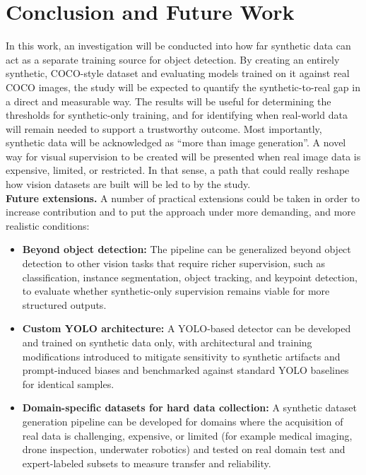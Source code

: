 \documentclass[conference]{IEEEtran}
\begin{document}
\section{Conclusion and Future Work} 
In this work, an investigation will be conducted into how far synthetic data can act as a separate training source for object detection. By creating an entirely synthetic, COCO-style dataset and evaluating models trained on it against real COCO images, the study will be expected to quantify the synthetic-to-real gap in a direct and measurable way. The results will be useful for determining the thresholds for synthetic-only training, and for identifying when real-world data will remain needed to support a trustworthy outcome. Most importantly, synthetic data will be acknowledged as “more than image generation”. A novel way for visual supervision to be created will be presented when real image data is expensive, limited, or restricted. In that sense, a path that could really reshape how vision datasets are built will be led to by the study.
\\
\noindent \textbf{Future extensions.} A number of practical extensions could be taken in order to increase contribution and to put the approach under more demanding, and more realistic conditions:
\begin{itemize}[leftmargin=*,itemsep=2pt,topsep=2pt]
    \item \textbf{ Beyond object detection:} The pipeline can be generalized beyond object detection to other vision tasks that require richer supervision, such as classification, instance segmentation, object tracking, and keypoint detection, to evaluate whether synthetic-only supervision remains viable for more structured outputs.

    \item \textbf{Custom YOLO architecture:} A YOLO-based detector can be developed and trained on synthetic data only, with architectural and training modifications introduced to mitigate sensitivity to synthetic artifacts and prompt-induced biases and benchmarked against standard YOLO baselines for identical samples.
    \item \textbf{Domain-specific datasets for hard data collection:} A synthetic dataset generation pipeline can be developed for domains where the acquisition of real data is challenging, expensive, or limited (for example medical imaging, drone inspection, underwater robotics) and tested on real domain test and expert-labeled subsets to measure transfer and reliability.
\end{itemize}
\end{document}
